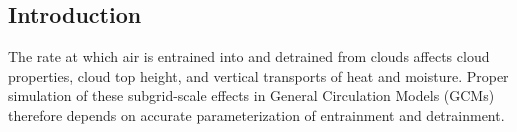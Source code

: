 \documentclass[draft,grl]{agutex}
\begin{document}
%
%

%

\begin{article}

%
%

\section{Introduction}

The rate at which air is entrained into and detrained from clouds affects cloud 
properties, cloud top height, and vertical transports of heat and moisture.  
Proper simulation of these subgrid-scale effects in General Circulation Models 
(GCMs) therefore depends on accurate parameterization of entrainment and 
detrainment.


\end{article}
\end{document}
